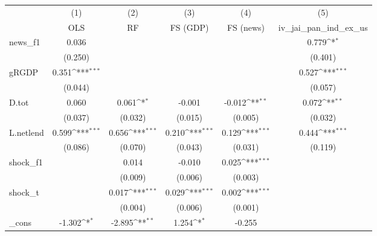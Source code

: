 {
\def\sym#1{\ifmmode^{#1}\else\(^{#1}\)\fi}
\begin{tabular}{l*{5}{c}}
\toprule
            &\multicolumn{1}{c}{(1)}&\multicolumn{1}{c}{(2)}&\multicolumn{1}{c}{(3)}&\multicolumn{1}{c}{(4)}&\multicolumn{1}{c}{(5)}\\
            &\multicolumn{1}{c}{OLS}&\multicolumn{1}{c}{RF}&\multicolumn{1}{c}{FS (GDP)}&\multicolumn{1}{c}{FS (news)}&\multicolumn{1}{c}{iv\_jai\_pan\_ind\_ex\_us}\\
\midrule
news\_f1     &       0.036         &                     &                     &                     &       0.779\sym{*}  \\
            &     (0.250)         &                     &                     &                     &     (0.401)         \\
\addlinespace
gRGDP       &       0.351\sym{***}&                     &                     &                     &       0.527\sym{***}\\
            &     (0.044)         &                     &                     &                     &     (0.057)         \\
\addlinespace
D.tot       &       0.060         &       0.061\sym{*}  &      -0.001         &      -0.012\sym{**} &       0.072\sym{**} \\
            &     (0.037)         &     (0.032)         &     (0.015)         &     (0.005)         &     (0.032)         \\
\addlinespace
L.netlend   &       0.599\sym{***}&       0.656\sym{***}&       0.210\sym{***}&       0.129\sym{***}&       0.444\sym{***}\\
            &     (0.086)         &     (0.070)         &     (0.043)         &     (0.031)         &     (0.119)         \\
\addlinespace
shock\_f1    &                     &       0.014         &      -0.010         &       0.025\sym{***}&                     \\
            &                     &     (0.009)         &     (0.006)         &     (0.003)         &                     \\
\addlinespace
shock\_t     &                     &       0.017\sym{***}&       0.029\sym{***}&       0.002\sym{***}&                     \\
            &                     &     (0.004)         &     (0.006)         &     (0.001)         &                     \\
\addlinespace
\_cons      &      -1.302\sym{*}  &      -2.895\sym{**} &       1.254\sym{*}  &      -0.255         &                     \\

\end{tabular}}
